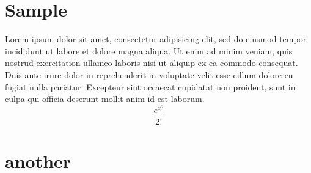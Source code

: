 \documentclass{book}
\begin{document}
\chapter{Sample}
Lorem ipsum dolor sit amet, consectetur adipisicing elit, sed do eiusmod tempor incididunt ut labore et dolore magna aliqua. Ut enim ad minim veniam, quis nostrud exercitation ullamco laboris nisi ut aliquip ex ea commodo consequat. Duis aute irure dolor in reprehenderit in voluptate velit esse cillum dolore eu fugiat nulla pariatur. Excepteur sint occaecat cupidatat non proident, sunt in culpa qui officia deserunt mollit anim id est laborum.
\lipsum[1-2]
$$
\frac{e^x^2}{2!}
$$

\chapter{another}
\lipsum[1-2]
\end{document}
